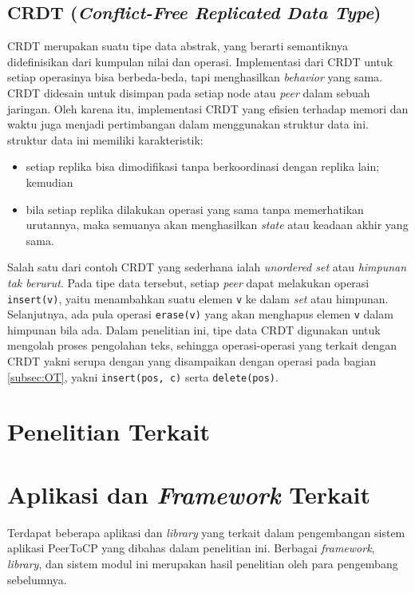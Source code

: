 \subsection{CRDT (\textit{Conflict-Free Replicated Data Type})}

CRDT merupakan suatu tipe data abstrak, yang berarti semantiknya didefinisikan dari kumpulan nilai dan operasi. Implementasi dari CRDT untuk setiap operasinya bisa berbeda-beda, tapi menghasilkan \textit{behavior} yang sama. CRDT didesain untuk disimpan pada setiap node atau \textit{peer} dalam sebuah jaringan. Oleh karena itu, implementasi CRDT yang efisien terhadap memori dan waktu juga menjadi pertimbangan dalam menggunakan struktur data ini. struktur data ini memiliki karakteristik:

\begin{itemize}[noitemsep]
    \item setiap replika bisa dimodifikasi tanpa berkoordinasi dengan replika lain; kemudian
    \item bila setiap replika dilakukan operasi yang sama tanpa memerhatikan urutannya, maka semuanya akan menghasilkan \textit{state} atau keadaan akhir yang sama.
\end{itemize}

Salah satu dari contoh CRDT yang sederhana ialah \textit{unordered set} atau \textit{himpunan tak berurut}. Pada tipe data tersebut, setiap \textit{peer} dapat melakukan operasi \texttt{insert(v)}, yaitu menambahkan suatu elemen \texttt{v} ke dalam \textit{set} atau himpunan. Selanjutnya, ada pula operasi \texttt{erase(v)} yang akan menghapus elemen \texttt{v} dalam himpunan bila ada. Dalam penelitian ini, tipe data CRDT digunakan untuk mengolah proses pengolahan teks, sehingga operasi-operasi yang terkait dengan CRDT yakni serupa dengan yang disampaikan dengan operasi pada bagian \ref{subsec:OT}, yakni \texttt{insert(pos, c)} serta \texttt{delete(pos)}.

\section{Penelitian Terkait}

\section{Aplikasi dan \textit{Framework} Terkait}

Terdapat beberapa aplikasi dan \textit{library} yang terkait dalam pengembangan sistem aplikasi PeerToCP yang dibahas dalam penelitian ini. Berbagai \textit{framework}, \textit{library}, dan sistem modul ini merupakan hasil penelitian oleh para pengembang sebelumnya. 

